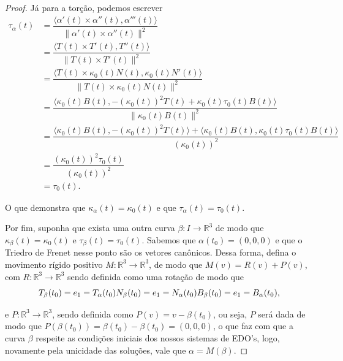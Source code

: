 \documentclass{article}
\begin{document}
\begin{proof}
    Já para a torção, podemos escrever 
    \begin{equation*}
        \begin{split}
            \tau_\alpha(t) & = \dfrac{\langle \alpha'(t)\times \alpha''(t), \alpha'''(t)\rangle}{\|\alpha'(t)\times \alpha''(t)\|^2} \\
            & = \dfrac{\langle T(t)\times T'(t), T''(t)\rangle}{\|T(t)\times T'(t)\|^2} \\
            & = \dfrac{\langle T(t)\times \kappa_0(t)N(t), \kappa_0(t)N'(t)\rangle}{\|T(t)\times \kappa_0(t)N(t)\|^2} \\
            & = \dfrac{\langle \kappa_0(t)B(t), -(\kappa_0(t))^2T(t) + \kappa_0(t)\tau_0(t)B(t)\rangle}{\|\kappa_0(t)B(t)\|^2} \\
            & = \dfrac{\langle \kappa_0(t)B(t), -\left(\kappa_0(t)\right)^2T(t)\rangle + \langle \kappa_0(t)B(t), \kappa_0(t)\tau_0(t)B(t)\rangle}{\left(\kappa_0(t)\right)^2} \\
            & = \dfrac{\left(\kappa_0(t)\right)^2\tau_0(t)}{\left(\kappa_0(t)\right)^2} \\
            & = \tau_0(t).
        \end{split}
    \end{equation*}
    
    O que demonstra que $\kappa_\alpha(t) = \kappa_0(t)$ e que $\tau_\alpha(t) = \tau_0(t)$.
    
    Por fim, suponha que exista uma outra curva $\beta : I\to \mathbb{R}^3$ de modo que $\kappa_\beta(t) = \kappa_0(t)$ e $\tau_\beta(t) = \tau_0(t)$. Sabemos que $\alpha(t_0) = (0, 0, 0)$ e que o Triedro de Frenet nesse ponto são os vetores canônicos. Dessa forma, defina o movimento rígido positivo $M : \mathbb{R}^3\to \mathbb{R}^3$, de modo que $M(v) = R(v) + P(v)$, com $R : \mathbb{R}^3\to \mathbb{R}^3$ sendo definida como uma rotação de modo que
    \begin{equation*}
        T_\beta(t_0) = e_1 = T_\alpha(t_0) \\
        N_\beta(t_0) = e_1 = N_\alpha(t_0) \\
        B_\beta(t_0) = e_1 = B_\alpha(t_0),
    \end{equation*}
    
    \noindent e $P : \mathbb{R}^3\to \mathbb{R}^3$, sendo definida como $P(v) = v - \beta(t_0)$, ou seja, $P$ será dada de modo que $P(\beta(t_0)) = \beta(t_0) - \beta(t_0) = (0, 0, 0)$, o que faz com que a curva $\beta$ respeite as condições iniciais dos nossos sistemas de EDO's, logo, novamente pela unicidade das soluções, vale que $\alpha = M(\beta)$.
\end{proof}
\end{document}

